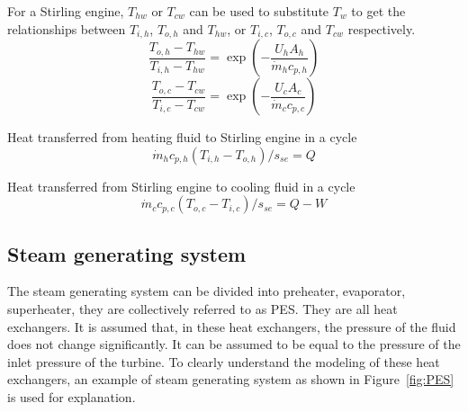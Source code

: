 For a Stirling engine, $T_{hw}$ or $T_{cw}$ can be used to substitute $T_w$ to get the relationships between $T_{i,h}$, $T_{o,h}$ and $T_{hw}$, or $T_{i,c}$, $T_{o,c}$ and $T_{cw}$ respectively.
\begin{equation}
	\frac{T_{o,h}-T_{hw}}{T_{i,h}-T_{hw}}=\exp(-\frac{U_hA_h}{\dot{m}_hc_{p,h}})
	\label{Eq:T_h}
\end{equation}
\begin{equation}
	\frac{T_{o,c}-T_{cw}}{T_{i,c}-T_{cw}}=\exp(-\frac{U_cA_c}{\dot{m}_cc_{p,c}})
	\label{Eq:T_c}
\end{equation}

Heat transferred from heating fluid to Stirling engine in a cycle
\begin{equation}
	\dot{m}_hc_{p,h}(T_{i,h}-T_{o,h})/s_{se} = Q
	\label{Eq:q_h}
\end{equation}

Heat transferred from Stirling engine to cooling fluid in a cycle
\begin{equation}
	\dot{m}_cc_{p,c}(T_{o,c}-T_{i,c})/s_{se} = Q - W
	\label{Eq:q_c}
\end{equation}


\subsection{Steam generating system}
The steam generating system can be divided into preheater, evaporator, superheater, they are collectively referred to as PES. They are all heat exchangers. It is assumed that, in these heat exchangers, the pressure of the fluid does not change significantly. It can be assumed to be equal to the pressure of the inlet pressure of the turbine. To clearly understand the modeling of these heat exchangers, an example of steam generating system as shown in Figure~\ref{fig:PES} is used for explanation.

